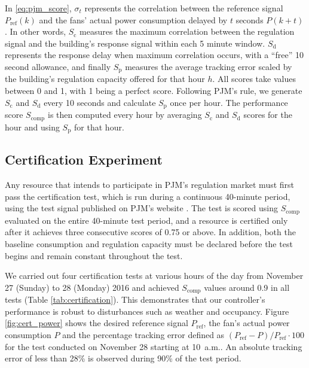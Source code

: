 In \eqref{eq:pjm_score}, $\sigma_t$ represents the correlation between the reference signal $P_{\text{ref}}(k)$ and the fans' actual power consumption delayed by $t$ seconds $P(k+t)$. 
In other words, $S_\text{c}$ measures the maximum correlation between the regulation signal and the building's response signal within each 5 minute window. $S_\text{d}$ represents the response delay when maximum correlation occurs, with a ``free'' 10 second allowance, and finally $S_\text{p}$ measures the average tracking error scaled by the building's regulation capacity offered for that hour $h$.
All scores take values between 0 and 1, with 1 being a perfect score. 
Following PJM's rule, we generate $S_\text{c}$ and $S_\text{d}$ every 10 seconds and calculate $S_\text{p}$ once per hour.
The performance score $S_\text{comp}$ is then computed every hour by averaging $S_\text{c}$ and $S_\text{d}$ scores for the hour and using $S_\text{p}$ for that hour.




\subsection{Certification Experiment}\label{sec:certification_exp}
Any resource that intends to participate in PJM's regulation market must first pass the certification test, which is run during a continuous 40-minute period, using the test signal published on PJM's website \cite{PJM_signal_price}.
The test is scored using $S_\text{comp}$ evaluated on the entire 40-minute test period, and a resource is certified only after it achieves three consecutive scores of 0.75 or above.
In addition, both the baseline consumption and regulation capacity must be declared before the test begins and remain constant throughout the test.



We carried out four certification tests at various hours of the day from November 27 (Sunday) to 28 (Monday) 2016 and achieved $S_\text{comp}$ values around 0.9 in all tests (Table \ref{tab:certification}). This demonstrates that our controller's performance is robust to disturbances such as weather and occupancy. 
Figure \ref{fig:cert_power} shows the desired reference signal $P_{\text{ref}}$, the fan's actual power consumption $P$ and the percentage tracking error defined as $(P_\text{ref} - P)/P_\text{ref} \cdot 100 $ for the test conducted on November 28 starting at 10~a.m.. An absolute tracking error of less than 28\% is observed during 90\% of the test period.

